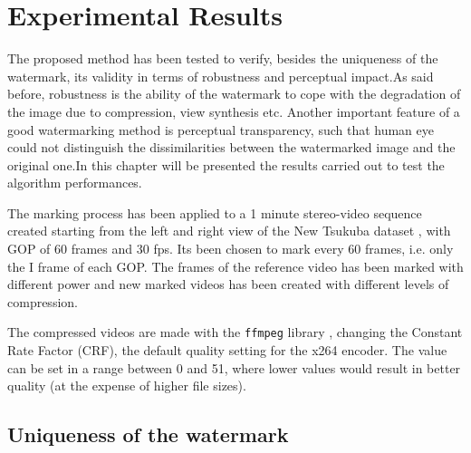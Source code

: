 \chapter{Experimental Results}
\label{exp}

The proposed method has been tested to verify, besides the uniqueness of the watermark, its validity in terms of robustness and perceptual impact.\newline As said before, robustness is the ability of the watermark to cope with the degradation of the image due to compression, view synthesis etc.\newline 
Another important feature of a good watermarking method is perceptual transparency, such that human eye could not distinguish the dissimilarities between the watermarked image and the original one.\newline In this chapter will be presented the results carried out to test the algorithm performances.\newline


The marking process has been applied to a 1 minute stereo-video sequence created starting from the left and right view of the New Tsukuba dataset \cite{tsu}, with GOP of 60 frames and 30 fps.\newline 
Its been chosen to mark every 60 frames, i.e. only the I frame of each GOP.\newline 
The frames of the reference video has been marked with different power and new marked videos has been created with different levels of compression.\newline 

The compressed videos are made with the \texttt{ffmpeg} library \cite{ffmapeg}, changing the Constant Rate Factor (CRF), the default quality setting for the x264 encoder. The value can be set in a range between 0 and 51, where lower values would result in better quality (at the expense of higher file sizes). 

\section{Uniqueness of the watermark}

